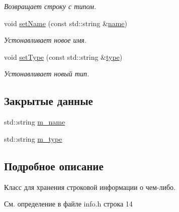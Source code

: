 \begin{DoxyCompactItemize}
\begin{DoxyCompactList}\small\item\em Возвращает строку с типом. \end{DoxyCompactList}\item 
\hypertarget{class_core_1_1_info_aec94bce55147a4440ea52199706f6477}{}\label{class_core_1_1_info_aec94bce55147a4440ea52199706f6477} 
void \hyperlink{class_core_1_1_info_aec94bce55147a4440ea52199706f6477}{set\+Name} (const std\+::string \&\hyperlink{class_core_1_1_info_a435d4329f0f780950d2c3c73507001df}{name})
\begin{DoxyCompactList}\small\item\em Устонавливает новое имя. \end{DoxyCompactList}\item 
\hypertarget{class_core_1_1_info_af6dffe2ec6648d8d6f383d55bb1f4228}{}\label{class_core_1_1_info_af6dffe2ec6648d8d6f383d55bb1f4228} 
void \hyperlink{class_core_1_1_info_af6dffe2ec6648d8d6f383d55bb1f4228}{set\+Type} (const std\+::string \&\hyperlink{class_core_1_1_info_afdee8b88ea976de87576b3314b24aec0}{type})
\begin{DoxyCompactList}\small\item\em Устонавливает новый тип. \end{DoxyCompactList}\end{DoxyCompactItemize}
\subsection*{Закрытые данные}
\begin{DoxyCompactItemize}
\item 
std\+::string \hyperlink{class_core_1_1_info_a027464b5db2e89c6c2f48faf99d25b22}{m\+\_\+name}
\item 
std\+::string \hyperlink{class_core_1_1_info_aa5d089f59122826625d6dd68af47775e}{m\+\_\+type}
\end{DoxyCompactItemize}


\subsection{Подробное описание}
Класс для хранения строковой информации о чем-\/либо. 

См. определение в файле info.\+h строка 14



